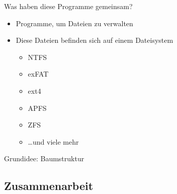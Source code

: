 \begin{frame}
    \slidehead
    \begin{center}
        
        \hspace{2em}
        
        \hspace{2em}
        
        \hspace{2em}
        

        \vspace{1em}
        Was haben diese Programme gemeinsam?
    \end{center}

    \vspace{1ex}
    \pause
    \begin{itemize}
        [<+->]
        \item Programme, um Dateien zu verwalten
        \item Diese Dateien befinden sich auf einem Dateisystem
            \begin{itemize}
                \item NTFS
                \item exFAT
                \item ext4
                \item APFS
                \item ZFS
                \item \dots und viele mehr
            \end{itemize}
    \end{itemize}
\end{frame}

\begin{frame}
    \slidehead
    Grundidee: Baumstruktur
    \\
    \vspace{1em}
    \begin{center}
    \end{center}
\end{frame}

\subsection{Zusammenarbeit}\label{subsec:zusammenarbeit}

